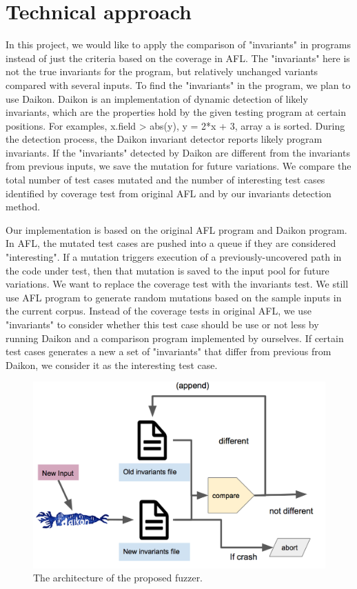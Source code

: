 \documentclass[sigplan,10pt,review = false]{acmart}\settopmatter{printfolios=true,printccs=false,printacmref=false}
\begin{document}
\section{Technical approach}
In this project, we would like to apply the comparison of "invariants" in programs instead of just the criteria based on the coverage in AFL. The "invariants" here is not the true invariants for the program, but relatively unchanged variants compared with several inputs. To find the "invariants" in the program, we plan to use Daikon. Daikon is an implementation of dynamic detection of likely invariants, which are the properties hold by the given testing program at certain positions. For examples, x.field > abs(y), y = 2*x + 3, array a is sorted. During the detection process, the Daikon invariant detector reports likely program invariants. If the "invariants" detected by Daikon are different from the invariants from previous inputs, we save the mutation for future variations. We compare the total number of test cases mutated and the number of interesting test cases identified by coverage test from original AFL and by our invariants detection method.

Our implementation is based on the original AFL program and Daikon program. In AFL, the mutated test cases are pushed into a queue if they are considered "interesting". If a mutation triggers execution of a previously-uncovered path in the code under test, then that mutation is saved to the input pool for future variations. We want to replace the coverage test with the invariants test. We still use AFL program to generate random mutations based on the sample inputs in the current corpus. Instead of the coverage tests in original AFL, we use "invariants" to consider whether this test case should be use or not less by running Daikon and a comparison program implemented by ourselves. If certain test cases generates a new a set of "invariants" that differ from previous from Daikon, we consider it as the interesting test case. 

\begin{figure}[h]
\centering
\includegraphics[scale=.45]{our_arc}
\caption{The architecture of the proposed fuzzer.}
\end{figure}
\end{document}

